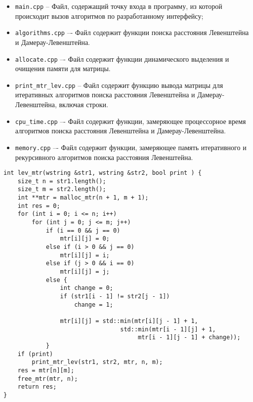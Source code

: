 \begin{itemize}
	\item \texttt{main.cpp} -- Файл, содержащий точку входа в программу, из которой происходит вызов алгоритмов по разработанному интерфейсу;
	\item \texttt{algorithms.cpp} –- Файл содержит функции поиска расстояния Левенштейна и Дамерау-Левенштейна.
	\item \texttt{allocate.cpp} –- Файл содержит функции динамического выделения и очищения памяти для матрицы.
	\item \texttt{print\_mtr\_lev.cpp} -- Файл содержит функцию вывода матрицы для итеративных алгоритмов поиска расстояния Левенштейна и Дамерау-Левенштейна, включая строки.
	\item \texttt{cpu\_time.cpp} –- Файл содержит функции, замеряющее процессорное время алгоритмов поиска расстояния Левенштейна и Дамерау-Левенштейна.
	\item \texttt{memory.cpp} –- Файл содержит функции, замеряющее память итеративного и рекурсивного алгоритмов поиска расстояния Левенштейна.
\end{itemize}

\begin{lstlisting}[label=lst:lev_mtr,caption=Функция нахождения расстояния Левенштейна с использованием матрицы]
int lev_mtr(wstring &str1, wstring &str2, bool print ) {
	size_t n = str1.length();
	size_t m = str2.length();
	int **mtr = malloc_mtr(n + 1, m + 1);
	int res = 0;
	for (int i = 0; i <= n; i++)
		for (int j = 0; j <= m; j++)
			if (i == 0 && j == 0)
				mtr[i][j] = 0;
			else if (i > 0 && j == 0)
				mtr[i][j] = i;
			else if (j > 0 && i == 0)
				mtr[i][j] = j;
			else {
				int change = 0;
				if (str1[i - 1] != str2[j - 1])
					change = 1;
				
				mtr[i][j] = std::min(mtr[i][j - 1] + 1,
								 std::min(mtr[i - 1][j] + 1,
									  mtr[i - 1][j - 1] + change));
			}
	if (print)
		print_mtr_lev(str1, str2, mtr, n, m);
	res = mtr[n][m];
	free_mtr(mtr, n);
	return res;
}
\end{lstlisting}

\clearpage


